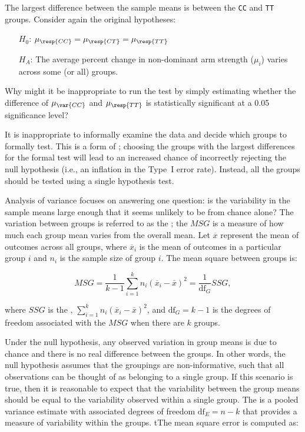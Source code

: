 \begin{example}{The largest difference between the sample means is between the \texttt{CC} and \texttt{TT} groups. Consider again the original hypotheses:
		\begin{itemize}
			\setlength{\itemsep}{0mm}
			\item[$H_0$:] $\mu_{\resp{CC}} = \mu_{\resp{CT}} = \mu_{\resp{TT}}$
			\item[$H_A$:] The average percent change in non-dominant arm strength ($\mu_i$) varies across some (or all) groups.
		\end{itemize}
		Why might it be inappropriate to run the test by simply estimating whether the difference of $\mu_{\var{CC}}$ and $\mu_{\resp{TT}}$ is statistically significant at a 0.05 significance level?}
	\label{multipleComparisonExample}
	
	It is inappropriate to informally examine the data and decide which groups to formally test. This is a form of ; choosing the groups with the largest differences for the formal test will lead to an increased chance of incorrectly rejecting the null hypothesis (i.e., an inflation in the Type~I error rate). Instead, all the groups should be tested using a single hypothesis test.
\end{example}

Analysis of variance focuses on answering one question: is the variability in the sample means large enough that it seems unlikely to be from chance alone? The variation between groups is referred to as the ; the $MSG$ is a measure of how much each group mean varies from the overall mean. Let $\overline{x}$ represent the mean of outcomes across all groups, where $\overline{x}_i$ is the mean of outcomes in a particular group $i$ and $n_i$ is the sample size of group $i$. The mean square between groups is:

\[MSG = \frac{1}{k-1}\sum_{i=1}^{k} n_{i}\left(\overline{x}_{i} - \overline{x}\right)^{2} = \frac{1}{\textrm{df}_{G}}SSG,\] 

where $SSG$ is the , $\sum_{i=1}^{k} n_{i}\left(\overline{x}_{i} - \overline{x}\right)^{2}$, and $\textrm{df}_{G}=k-1$ is the degrees of freedom associated with the $MSG$ when there are $k$ groups.

Under the null hypothesis, any observed variation in group means is due to chance and there is no real difference between the groups. In other words, the null hypothesis assumes that the groupings are non-informative, such that all observations can be thought of as belonging to a single group. If this scenario is true, then it is reasonable to expect that the variability between the group means should be equal to the variability observed within a single group. The  is a pooled variance estimate with associated degrees of freedom $\textrm{df}_E=n-k$ that provides a measure of variability within the groups. tThe mean square error is computed as:

